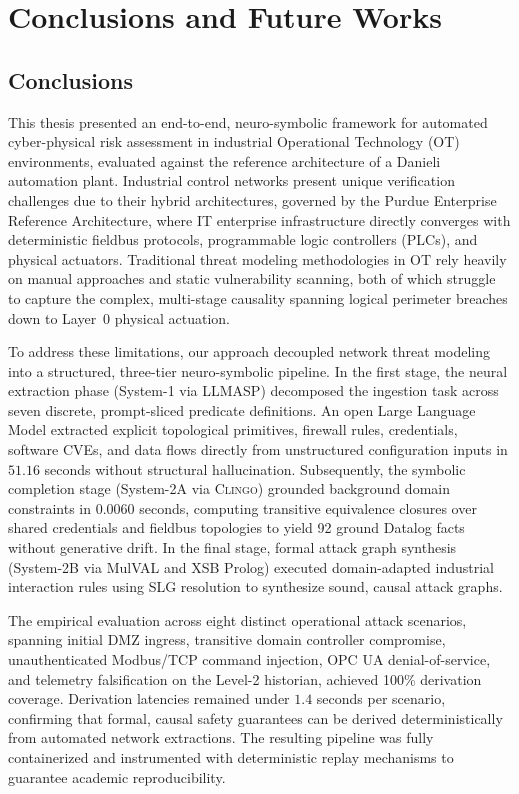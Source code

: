 \documentclass[target=mst,aauheader=aics,style=]{thud}
\begin{document}
\chapter{Conclusions and Future Works}
\label{ch:conclusions}

\section{Conclusions}
\label{sec:conclusions}

This thesis presented an end-to-end, neuro-symbolic framework for automated cyber-physical risk assessment in industrial Operational Technology (OT) environments, evaluated against the reference architecture of a Danieli automation plant. Industrial control networks present unique verification challenges due to their hybrid architectures, governed by the Purdue Enterprise Reference Architecture, where IT enterprise infrastructure directly converges with deterministic fieldbus protocols, programmable logic controllers (PLCs), and physical actuators. 
Traditional threat modeling methodologies in OT rely heavily on manual approaches and static vulnerability scanning, both of which struggle to capture the complex, multi-stage causality spanning logical perimeter breaches down to Layer~0 physical actuation.

To address these limitations, our approach decoupled network threat modeling into a structured, three-tier neuro-symbolic pipeline. In the first stage, the neural extraction phase (System-1 via LLMASP) decomposed the ingestion task across seven discrete, prompt-sliced predicate definitions. An open Large Language Model extracted explicit topological primitives, firewall rules, credentials, software CVEs, and data flows directly from unstructured configuration inputs in $51.16$ seconds without structural hallucination. Subsequently, the symbolic completion stage (System-2A via \textsc{Clingo}) grounded background domain constraints in $0.0060$ seconds, computing transitive equivalence closures over shared credentials and fieldbus topologies to yield 92 ground Datalog facts without generative drift. In the final stage, formal attack graph synthesis (System-2B via MulVAL and XSB Prolog) executed domain-adapted industrial interaction rules using SLG resolution to synthesize sound, causal attack graphs.

The empirical evaluation across eight distinct operational attack scenarios, spanning initial DMZ ingress, transitive domain controller compromise, unauthenticated Modbus/TCP command injection, OPC UA denial-of-service, and telemetry falsification on the Level-2 historian, achieved 100\% derivation coverage. Derivation latencies remained under $1.4$ seconds per scenario, confirming that formal, causal safety guarantees can be derived deterministically from automated network extractions. The resulting pipeline was fully containerized and instrumented with deterministic replay mechanisms to guarantee academic reproducibility.
\end{document}
